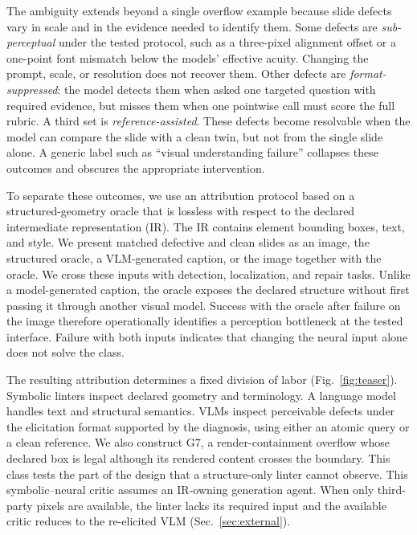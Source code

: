 \documentclass[letterpaper]{article}            %
\newcommand{\g}[1]{\textsf{#1}}        %
\begin{document}
The ambiguity extends beyond a single overflow example because slide defects vary in scale and in the evidence
needed to identify them. Some defects are \emph{sub-perceptual} under the tested protocol, such as a three-pixel
alignment offset
or a one-point font mismatch below the models' effective acuity. Changing the prompt, scale, or resolution does
not recover them. Other defects are \emph{format-suppressed}: the model detects them when asked one targeted
question with required evidence, but misses them when one pointwise call must score the full rubric. A third
set is \emph{reference-assisted}. These defects become resolvable when the model can compare the slide with a
clean twin, but not from the single slide alone. A generic label such as ``visual understanding failure''
collapses these outcomes and obscures the appropriate intervention.

To separate these outcomes, we use an attribution protocol based on a structured-geometry oracle that is
lossless with respect to the declared intermediate representation (IR). The IR contains element bounding boxes,
text, and style. We present matched defective and clean slides as an image, the structured oracle, a VLM-generated caption, or the
image together with the oracle. We cross these inputs with detection, localization, and repair tasks. Unlike a
model-generated caption, the oracle exposes the declared structure without first passing it through another
visual model. Success with the oracle after failure on the image therefore operationally identifies a
perception bottleneck at the tested interface. Failure with both inputs indicates that changing the neural input
alone does not solve the class.

The resulting attribution determines a fixed division of labor (Fig.~\ref{fig:teaser}). Symbolic linters inspect
declared geometry and terminology. A language model handles text and structural semantics. VLMs inspect
perceivable defects under the elicitation format supported by the diagnosis, using either an atomic query or a
clean reference. We also construct \g{G7}, a render-containment overflow whose declared box is legal although
its rendered content crosses the boundary. This class tests the part of the design that a structure-only linter
cannot observe. This symbolic--neural critic assumes an IR-owning generation agent. When only
third-party pixels are available, the linter lacks its required input and the available critic reduces to the
re-elicited VLM (Sec.~\ref{sec:external}).
\end{document}
